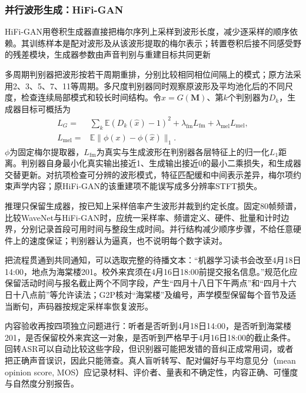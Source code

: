 \subsubsection{并行波形生成：HiFi-GAN}
\label{sec:nlp-speech-hifigan}

HiFi-GAN用卷积生成器直接把梅尔序列上采样到波形长度，减少逐采样的顺序依赖。其训练样本是配对波形及从该波形提取的梅尔表示；转置卷积后接不同感受野的残差模块，生成器参数由声音判别与重建目标共同更新

多周期判别器把波形按若干周期重排，分别比较相同相位间隔上的模式；原方法采用2、3、5、7、11等周期。多尺度判别器同时观察原波形及平均池化后的不同尺度，检查连续局部模式和较长时间结构。令$\hat x=G(\bm{M})$、第$k$个判别器为$D_k$，生成器目标可概括为
\begin{equation}
\begin{aligned}
 L_G={}&\sum_k\mathbb{E}(D_k(\hat x)-1)^2
       +\lambda_{\mathrm{fm}}L_{\mathrm{fm}}
       +\lambda_{\mathrm{mel}}L_{\mathrm{mel}},\\
 L_{\mathrm{mel}}={}&\mathbb{E}\lVert
        \phi(x)-\phi(\hat x)\rVert_1 .
\end{aligned}
\label{eq:nlp-speech-hifigan}
\end{equation}
$\phi$为固定梅尔提取器，$L_{\mathrm{fm}}$为真实与生成波形在判别器各层特征上的归一化$L_1$距离。判别器自身最小化真实输出接近1、生成输出接近0的最小二乘损失，和生成器交替更新。对抗项检查可分辨的波形模式，特征匹配缓和中间表示差异，梅尔项约束声学内容；原HiFi-GAN的该重建项不能误写成多分辨率STFT损失。

推理只保留生成器，按已知上采样倍率产生波形并裁到约定长度。固定80帧频谱，比较WaveNet与HiFi-GAN时，应统一采样率、频谱定义、硬件、批量和计时边界，分别记录首段可用时间与整段生成时间。并行结构减少顺序步骤，不给任意硬件上的速度保证；判别器认为逼真，也不说明每个数字读对。

把流程贯通到共同通知，可以选取完整的待播文本：“机器学习读书会改至4月18日14:00，地点为海棠楼201。校外来宾须在4月16日18:00前提交报名信息。”规范化应保留活动时间与报名截止两个不同字段，产生“四月十八日下午两点”和“四月十六日十八点前”等允许读法；G2P核对“海棠楼”及编号，声学模型保留每个音节及适当断句，声码器按规定采样率恢复波形。

内容验收再按四项独立问题进行：听者是否听到4月18日14:00，是否听到海棠楼201，是否保留校外来宾这一对象，是否听到严格早于4月16日18:00的截止条件。回转ASR可以自动比较这些字段，但识别器可能把发错的音纠正成常用词，或者把正确声音误识，因此只能筛查。真人盲听转写、配对偏好与平均意见分（mean opinion score, MOS）应记录材料、评价者、量表和不确定性，内容正确、可懂度与自然度分别报告。

